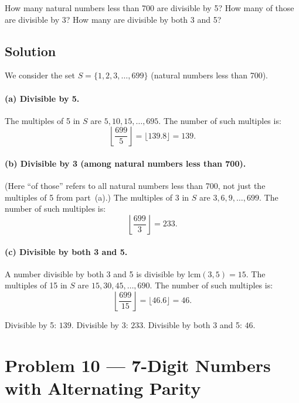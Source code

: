 \documentclass[12pt, a4paper]{article}
\begin{document}
\begin{problembox}
How many natural numbers less than 700 are divisible by 5?
How many of those are divisible by 3?
How many are divisible by both 3 and 5?
\end{problembox}

\subsection*{Solution}

We consider the set $S = \{1, 2, 3, \ldots, 699\}$ (natural numbers less than 700).

\paragraph{(a) Divisible by 5.}
The multiples of 5 in $S$ are $5, 10, 15, \ldots, 695$.
The number of such multiples is:
\[
  \left\lfloor \frac{699}{5} \right\rfloor = \lfloor 139.8 \rfloor = 139.
\]

\paragraph{(b) Divisible by 3 (among natural numbers less than 700).}
(Here ``of those'' refers to all natural numbers less than 700, not just the multiples of 5 from part~(a).)
The multiples of 3 in $S$ are $3, 6, 9, \ldots, 699$.
The number of such multiples is:
\[
  \left\lfloor \frac{699}{3} \right\rfloor = 233.
\]

\paragraph{(c) Divisible by both 3 and 5.}
A number divisible by both 3 and 5 is divisible by $\mathrm{lcm}(3,5) = 15$.
The multiples of 15 in $S$ are $15, 30, 45, \ldots, 690$.
The number of such multiples is:
\[
  \left\lfloor \frac{699}{15} \right\rfloor = \lfloor 46.6 \rfloor = 46.
\]

\begin{answerbox}
\centering
Divisible by 5: $\boxed{139}$. \qquad
Divisible by 3: $\boxed{233}$. \qquad
Divisible by both 3 and 5: $\boxed{46}$.
\end{answerbox}

\newpage
\section{Problem 10 --- 7-Digit Numbers with Alternating Parity}
\end{document}
